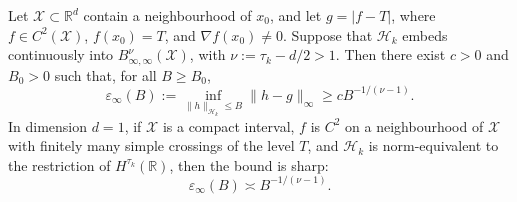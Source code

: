 \begin{theorem}
\label{app:thm-barrier}
Let $\mathcal X\subset\mathbb R^d$ contain a neighbourhood of $x_0$,
and let $g=|f-T|$, where $f\in C^2(\mathcal X)$,
$f(x_0)=T$, and $\nabla f(x_0)\neq0$.
Suppose that $\mathcal H_k$ embeds continuously into
$B^\nu_{\infty,\infty}(\mathcal X)$, with
$\nu:=\tau_k-d/2>1$. Then there exist $c>0$ and $B_0>0$
such that, for all $B\ge B_0$,
\[
\varepsilon_\infty(B)
:=\inf_{\|h\|_{\mathcal H_k}\le B}\|h-g\|_\infty
\ge cB^{-1/(\nu-1)}.
\]
In dimension $d=1$, if $\mathcal X$ is a compact interval,
$f$ is $C^2$ on a neighbourhood of $\mathcal X$ with finitely
many simple crossings of the level $T$, and
$\mathcal H_k$ is norm-equivalent to the restriction of
$H^{\tau_k}(\mathbb R)$, then the bound is sharp:
\[
\varepsilon_\infty(B)\asymp B^{-1/(\nu-1)}.
\]
\end{theorem}

